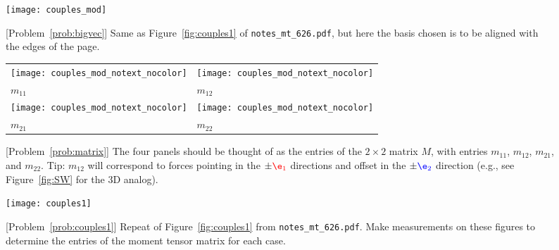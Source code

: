 \documentclass[11pt,titlepage,fleqn]{article}
\newcommand{\mtfile}{\texttt{notes\_mt\_626.pdf}}
\newcommand{\eone}{\textcolor{red}{\e_1}}
\newcommand{\etwo}{\textcolor{blue}{\e_2}}
\begin{document}



\begin{figure}
\centering
\texttt{[image: couples\_mod]}
\caption{
[Problem~\ref{prob:bigvec}] Same as Figure~\ref{fig:couples1} of \mtfile, but here the basis chosen is to be aligned with the edges of the page.
\label{fig:template}
}
\end{figure}


\begin{figure}
\centering
\begin{tabular}{|l|l|}
\hline
\texttt{[image: couples\_mod\_notext\_nocolor]} & 
\texttt{[image: couples\_mod\_notext\_nocolor]} \\
$m_{11}$ & $m_{12}$ \\ \hline
\texttt{[image: couples\_mod\_notext\_nocolor]} &
\texttt{[image: couples\_mod\_notext\_nocolor]} \\
$m_{21}$ & $m_{22}$ \\ \hline
\end{tabular}
\caption{
[Problem~\ref{prob:matrix}] 
The four panels should be thought of as the entries of the $2 \times 2$ matrix $M$, with entries $m_{11}$, $m_{12}$, $m_{21}$, and $m_{22}$.
Tip: $m_{12}$ will correspond to forces pointing in the $\pm\eone$ directions and offset in the $\pm\etwo$ direction (e.g., see Figure~\ref{fig:SW} for the 3D analog).
\label{fig:template4}
}
\end{figure}

\begin{figure}
\hspace{-1cm}
\texttt{[image: couples1]}
\caption{
[Problem~\ref{prob:couples1}] Repeat of Figure~\ref{fig:couples1} from \mtfile.
Make measurements on these figures to determine the entries of the moment tensor matrix for each case.
\label{fig:template_couples1}
}
\end{figure}
\end{document}
